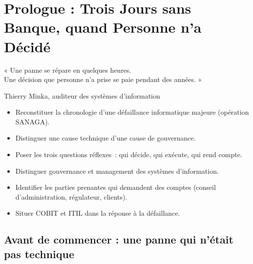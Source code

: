 
\chapter[Prologue : Trois Jours sans Banque]{Prologue : Trois Jours sans Banque, quand Personne n'a Décidé}
\label{chap:prologue}

\epigraph{%
    « Une panne se répare en quelques heures.\\
    Une décision que personne n'a prise se paie pendant des années. »%
}{Thierry Minka, auditeur des systèmes d'information}


\begin{boxobjectifs}
\begin{itemize}
    \item Reconstituer la chronologie d'une défaillance informatique majeure
          (opération SANAGA).
    \item Distinguer une cause technique d'une cause de gouvernance.
    \item Poser les trois questions réflexes~: qui décide, qui exécute, qui
          rend compte.
    \item Distinguer gouvernance et management des systèmes d'information.
    \item Identifier les parties prenantes qui demandent des comptes
          (conseil d'administration, régulateur, clients).
    \item Situer COBIT et ITIL dans la réponse à la défaillance.
\end{itemize}
\end{boxobjectifs}

\bigskip

\section*{Avant de commencer : une panne qui n'était pas technique}

